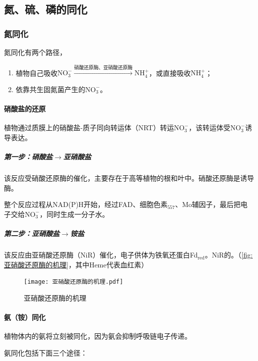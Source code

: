 \subsection{氮、硫、磷的同化}

\subsubsection{氮同化}

氮同化有两个路径，
\begin{enumerate}
	\item 植物自己吸收$\mathrm{NO_{3}^{-}}\xrightarrow{\text{硝酸还原酶、亚硝酸还原酶}}\mathrm{NH_{4}^{+}}$，或直接吸收$\mathrm{NH_{4}^{+}}$；
	\item 依靠共生固氮菌产生的$\mathrm{NO_{3}^{-}}$。
\end{enumerate}

\paragraph{硝酸盐的还原}

植物通过质膜上的硝酸盐-质子同向转运体（NRT）转运$\mathrm{NO_{3}^{-}}$，该转运体受$\mathrm{NO_{3}^{-}}$诱导表达。

\subparagraph{第一步：硝酸盐$\longrightarrow$亚硝酸盐}

该反应受硝酸还原酶的催化，主要存在于高等植物的根和叶中。硝酸还原酶是诱导酶。

整个反应过程从NAD(P)H开始，经过FAD、细胞色素$_{557}$、Mo辅因子，最后把电子交给$\mathrm{NO_{3}^{-}}$，同时生成一分子水。

\subparagraph{第二步：亚硝酸盐$\longrightarrow$铵盐}

该反应由亚硝酸还原酶（NiR）催化，电子供体为铁氧还蛋白Fd$_{\text{red}}$。NiR的。（\autoref{fig:亚硝酸还原酶的机理}，其中Heme代表血红素）

\begin{figure}[htbp]
	\centering
	\texttt{[image: 亚硝酸还原酶的机理.pdf]}
	\caption{亚硝酸还原酶的机理}
	\label{fig:亚硝酸还原酶的机理}
\end{figure}

\paragraph{氨（铵）同化}

植物体内的氨将立刻被同化，因为氨会抑制呼吸链电子传递。

氨同化包括下面三个途径：

